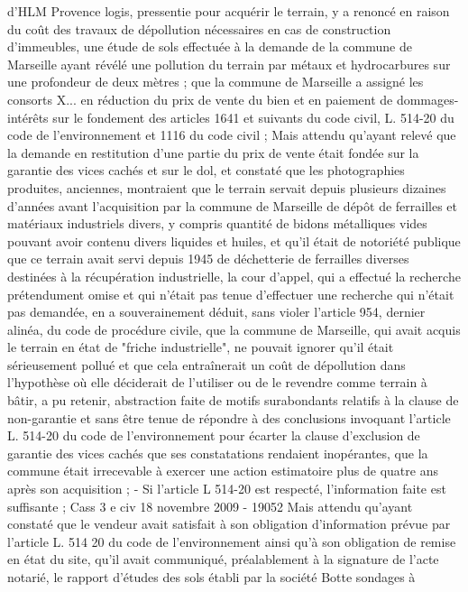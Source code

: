 \documentclass[11pt,a4paper]{report}
\begin{document}
	d'HLM Provence logis, pressentie pour acquérir le terrain, y a renoncé en raison du coût des travaux de
	dépollution nécessaires en cas de construction d'immeubles, une étude de sols effectuée à la demande de la
	commune de Marseille ayant révélé une pollution du terrain par métaux et hydrocarbures sur une profondeur de
	deux mètres ; que la commune de Marseille a assigné les consorts X... en réduction du prix de vente du bien et
	en paiement de dommages-intérêts sur le fondement des articles 1641 et suivants du code civil, L. 514-20 du
	code de l'environnement et 1116 du code civil ;
	Mais attendu qu'ayant relevé que la demande en restitution d'une partie du prix de vente était fondée sur la
	garantie des vices cachés et sur le dol, et constaté que les photographies produites, anciennes, montraient que le
	terrain servait depuis plusieurs dizaines d'années avant l'acquisition par la commune de Marseille de dépôt de
	ferrailles et matériaux industriels divers, y compris quantité de bidons métalliques vides pouvant avoir contenu
	divers liquides et huiles, et qu'il était de notoriété publique que ce terrain avait servi depuis 1945 de déchetterie
	de ferrailles diverses destinées à la récupération industrielle, la cour d'appel, qui a effectué la recherche
	prétendument omise et qui n'était pas tenue d'effectuer une recherche qui n'était pas demandée, en a
	souverainement déduit, sans violer l'article 954, dernier alinéa, du code de procédure civile, que la commune de
	Marseille, qui avait acquis le terrain en état de "friche industrielle", ne pouvait ignorer qu'il était sérieusement
	pollué et que cela entraînerait un coût de dépollution dans l'hypothèse où elle déciderait de l'utiliser ou de le
	revendre comme terrain à bâtir, a pu retenir, abstraction faite de motifs surabondants relatifs à la clause de
	non-garantie et sans être tenue de répondre à des conclusions invoquant l'article L. 514-20 du code de
	l'environnement pour écarter la clause d'exclusion de garantie des vices cachés que ses constatations rendaient
	inopérantes, que la commune était irrecevable à exercer une action estimatoire plus de quatre ans après son
	acquisition ;
	- Si l’article L 514-20 est respecté, l’information faite est suffisante ; Cass 3 e civ 18 novembre 2009 -
	19052
	Mais attendu qu'ayant constaté que le vendeur avait satisfait à son obligation d'information prévue par l'article
	L. 514 20 du code de l'environnement ainsi qu'à son obligation de remise en état du site, qu'il avait communiqué,
	préalablement à la signature de l'acte notarié, le rapport d'études des sols établi par la société Botte sondages à
\end{document}
